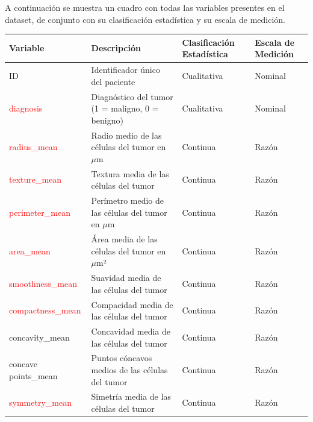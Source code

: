 \documentclass[a4paper, 12pt]{article}
\begin{document}
A continuación se muestra un cuadro con todas las variables presentes en el dataset, de conjunto con su clasificación estadística y su escala de medición.
\begin{center}
	

        \begin{tabular}{|p{3.5cm}|p{5.5cm}|p{3cm}|p{2.5cm}|}
            \hline
            \textbf{Variable} & \textbf{Descripción} & \textbf{Clasificación Estadística} & \textbf{Escala de Medición} \\
            \hline
            ID & Identificador único del paciente & Cualitativa & Nominal \\
            
            \textcolor{red}{diagnosis} & Diagnóstico del tumor (1 = maligno, 0 = benigno) & Cualitativa & Nominal \\
            
            \textcolor{red}{radius\_mean} & Radio medio de las células del tumor en $\mu$m & Continua & Razón \\
            
            \textcolor{red}{texture\_mean} & Textura media de las células del tumor & Continua & Razón \\
            
            \textcolor{red}{perimeter\_mean} & Perímetro medio de las células del tumor en $\mu$m & Continua & Razón \\
            
            \textcolor{red}{area\_mean} & Área media de las células del tumor en $\mu$m² & Continua & Razón \\
            
            \textcolor{red}{smoothness\_mean} & Suavidad media de las células del tumor & Continua & Razón \\
            
            \textcolor{red}{compactness\_mean} & Compacidad media de las células del tumor & Continua & Razón \\
            
            concavity\_mean & Concavidad media de las células del tumor & Continua & Razón \\
            
            concave points\_mean & Puntos cóncavos medios de las células del tumor & Continua & Razón \\
            
            \textcolor{red}{symmetry\_mean} & Simetría media de las células del tumor & Continua & Razón \\
            

\end{tabular}
\end{center}
\end{document}

